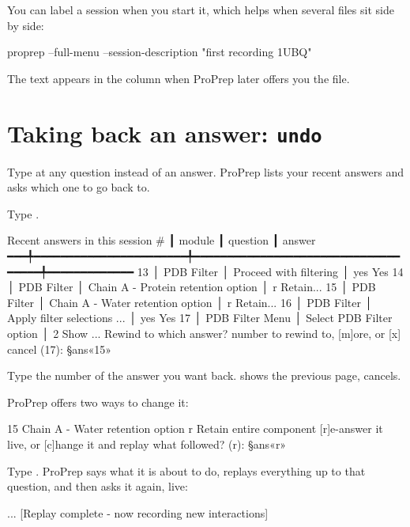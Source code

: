 You can label a session when you start it, which helps when several files sit
side by side:

\begin{terminal}
proprep --full-menu --session-description "first recording 1UBQ"
\end{terminal}

The text appears in the  column when ProPrep later offers you
the file.

\section{Taking back an answer: \texttt{undo}}
\label{sec:sessions-undo}

Type  at any question instead of an answer. ProPrep lists your
recent answers and asks which one to go back to.

\begin{steps}
  \item Type .
\begin{screen}
Recent answers in this session
 # ┃ module                ┃ question                           ┃ answer
━━━╇━━━━━━━━━━━━━━━━━━━━━━━╇━━━━━━━━━━━━━━━━━━━━━━━━━━━━━━━━━━━━╇━━━━━━━━━━━━━
13 │ PDB Filter            │ Proceed with filtering             │ yes  Yes
14 │ PDB Filter            │ Chain A - Protein retention option │ r  Retain...
15 │ PDB Filter            │ Chain A - Water retention option   │ r  Retain...
16 │ PDB Filter            │ Apply filter selections ...        │ yes  Yes
17 │ PDB Filter Menu       │ Select PDB Filter option           │ 2  Show ...
Rewind to which answer? number to rewind to, [m]ore, or [x] cancel (17): §ans«15»
\end{screen}
  \item Type the number of the answer you want back.  shows the
        previous page,  cancels.
  \item ProPrep offers two ways to change it:
\begin{screen}
  15  Chain A - Water retention option  r  Retain entire component
[r]e-answer it live, or [c]hange it and replay what followed? (r): §ans«r»
\end{screen}
  \item Type . ProPrep says what it is about to do, replays everything
        up to that question, and then asks it again, live:
\begin{screen}
...
[Replay complete - now recording new interactions]
\end{screen}
\end{steps}

